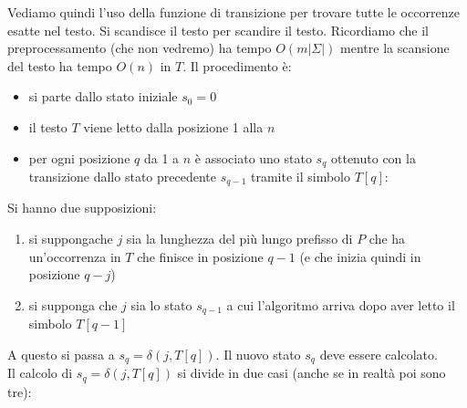 Vediamo quindi l'uso della funzione di transizione per trovare tutte le
occorrenze esatte nel testo. Si scandisce il testo per scandire il
testo. Ricordiamo che il preprocessamento (che non vedremo) ha tempo
$O(m|\Sigma|)$ mentre la scansione del testo ha tempo $O(n)$ in $T$.
Il procedimento è:
\begin{itemize}
  \item si parte dallo stato iniziale $s_0=0$
  \item il testo $T$ viene letto dalla posizione 1 alla $n$
  \item per ogni posizione $q$ da 1 a $n$ è associato uno stato $s_q$ ottenuto
  con la transizione dallo stato precedente $s_{q-1}$ tramite il simbolo $T[q]$:
  
\end{itemize}
\begin{center}
  \end{center}
Si hanno due supposizioni:
\begin{enumerate}
  \item si suppongache $j$ sia la lunghezza del più lungo prefisso di $P$ che ha
  un’occorrenza in $T$ che finisce in posizione $q-1$ (e che inizia quindi in
  posizione $q-j$)
  \item si supponga che $j$ sia lo stato $s_{q-1}$ a cui l'algoritmo arriva dopo
  aver letto il simbolo $T[q-1]$
\end{enumerate}
A questo si passa a $s_q=\delta(j,T[q])$. Il nuovo stato $s_q$ deve essere
calcolato. \\
Il calcolo di $s_q=\delta(j, T[q])$ si divide in due casi (anche se in realtà
poi sono tre):
